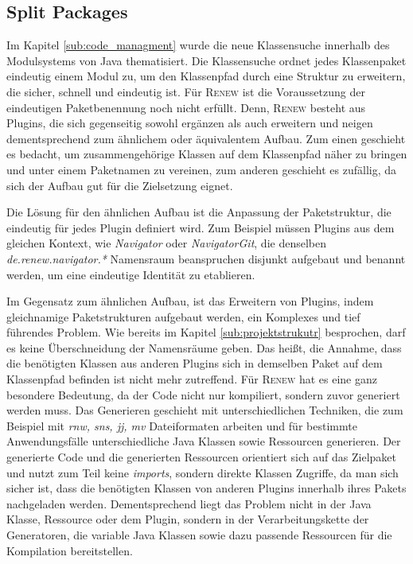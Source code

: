 	\subsection{Split Packages}
		Im Kapitel \ref{sub:code_managment}  wurde die neue Klassensuche innerhalb des Modulsystems von Java thematisiert. Die Klassensuche ordnet jedes Klassenpaket eindeutig einem Modul zu, um den Klassenpfad durch eine Struktur zu erweitern, die sicher, schnell und eindeutig ist. Für \textsc{Renew} ist die Voraussetzung der eindeutigen Paketbenennung noch nicht erfüllt. Denn, \textsc{Renew} besteht aus Plugins, die sich gegenseitig sowohl ergänzen als auch erweitern und neigen dementsprechend zum ähnlichem oder äquivalentem Aufbau. Zum einen geschieht es bedacht, um zusammengehörige Klassen auf dem Klassenpfad näher zu bringen und unter einem Paketnamen zu vereinen, zum anderen geschieht es zufällig, da sich der Aufbau gut für die Zielsetzung eignet.\bigbreak

		Die Lösung für den ähnlichen Aufbau ist die Anpassung der Paketstruktur, die eindeutig für jedes Plugin definiert wird. Zum Beispiel müssen Plugins aus dem gleichen Kontext, wie \textit{Navigator} oder \textit{NavigatorGit}, die denselben \textit{de.renew.navigator.*} Namensraum beanspruchen disjunkt aufgebaut und benannt werden, um eine eindeutige Identität zu etablieren. \bigbreak

		Im Gegensatz zum ähnlichen Aufbau, ist das Erweitern von Plugins, indem gleichnamige Paketstrukturen aufgebaut werden, ein Komplexes und tief führendes Problem. Wie bereits im Kapitel \ref{sub:projektstrukutr} besprochen, darf es keine Überschneidung der Namensräume geben. Das heißt, die  Annahme, dass die benötigten Klassen aus anderen Plugins sich in demselben Paket auf dem Klassenpfad befinden ist nicht mehr zutreffend. \newline
		Für \textsc{Renew} hat es eine ganz besondere Bedeutung, da der Code nicht nur kompiliert, sondern zuvor generiert werden muss. Das Generieren geschieht mit unterschiedlichen Techniken, die zum Beispiel mit \textit{rnw, sns, jj, mv} Dateiformaten arbeiten und für bestimmte Anwendungsfälle unterschiedliche Java Klassen sowie Ressourcen generieren. \newline
		Der generierte Code und die generierten Ressourcen orientiert sich auf das Zielpaket und nutzt zum Teil keine \textit{imports}, sondern direkte Klassen Zugriffe, da man sich sicher ist, dass die benötigten Klassen von anderen Plugins innerhalb ihres Pakets nachgeladen werden. Dementsprechend liegt das Problem nicht in der Java Klasse, Ressource oder dem Plugin, sondern in der Verarbeitungskette der Generatoren, die variable Java Klassen sowie dazu passende Ressourcen für die Kompilation bereitstellen. \bigbreak

